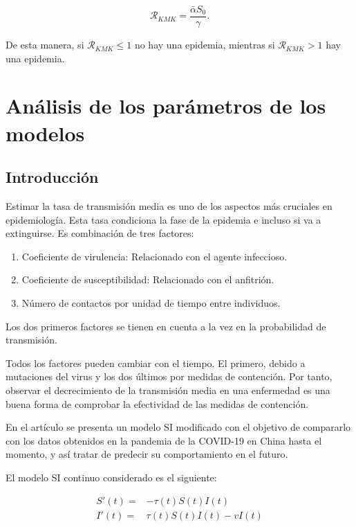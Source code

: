 $$\mathcal{R}_{KMK}=\frac{\bar{\alpha} S_0}{\gamma}.$$

De esta manera, si $\mathcal{R}_{KMK}\leq 1$ no hay una epidemia, mientras si $\mathcal{R}_{KMK}>1$ hay una epidemia. 





\section{Análisis de los parámetros de los modelos}

\subsection{Introducción}

Estimar la tasa de transmisión media es uno de los aspectos más cruciales en epidemiología. Esta tasa condiciona la fase de la epidemia e incluso si va a extinguirse. Es combinación de tres factores:

\begin{enumerate}
\item Coeficiente de virulencia: Relacionado con el agente infeccioso.
\item Coeficiente de susceptibilidad: Relacionado con el anfitrión.
\item Número de contactos por unidad de tiempo entre individuos.
\end{enumerate}

Los dos primeros factores se tienen en cuenta a la vez en la probabilidad de transmisión.

Todos los factores pueden cambiar con el tiempo. El primero, debido a mutaciones del virus y los dos últimos por medidas de contención. Por tanto, observar el decrecimiento de la transmisión media en una enfermedad es una buena forma de comprobar la efectividad de las medidas de contención.

En el artículo \cite{demongeotSIEpidemicModel} se presenta un modelo SI modificado con el objetivo de compararlo con los datos obtenidos en la pandemia de la COVID-19 en China hasta el momento, y así tratar de predecir su comportamiento en el futuro.

El modelo SI continuo considerado es el siguiente:

\begin{equation}
\label{eqn: SI_cont}
\begin{aligned}
S'(t) = & -\tau (t)S(t)I(t) \\
I'(t) = & \tau (t)S(t)I(t) -vI(t)
\end{aligned}
\end{equation}

